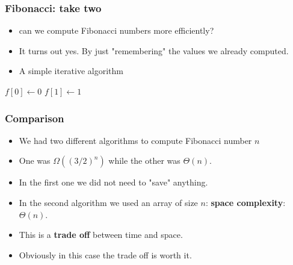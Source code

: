 \documentclass{beamer}
\newtheorem{lem}{Lemma}
\begin{document}
\begin{frame}
  \frametitle{Fibonacci: take two}
  \begin{itemize}
  \item can we compute Fibonacci numbers more efficiently?
  \item It turns out yes. By just "remembering" the values we already
    computed.
   \item A simple iterative algorithm
  \end{itemize}
\begin{function}[H]
  \DontPrintSemicolon
  \BlankLine
{}\;
$f[0]\gets 0$\;
$f[1]\gets 1$\;

\end{function}
  
\end{frame}
\begin{frame}
  \frametitle{Comparison}
  \begin{itemize}
  \item We had two different algorithms to compute Fibonacci number
    $n$
  \item One was $\Omega((3/2)^n)$ while the other was $\Theta(n)$.
  \item  In the first one we did not need to "save" anything.
   \item In the second algorithm we used an array of size $n$:
     \textbf{space complexity}: $\Theta(n)$.
 \item This is a \textbf{trade off} between time and space.
\item Obviously in this case the trade off is worth it.
  \end{itemize}
\end{frame}

\end{document}
